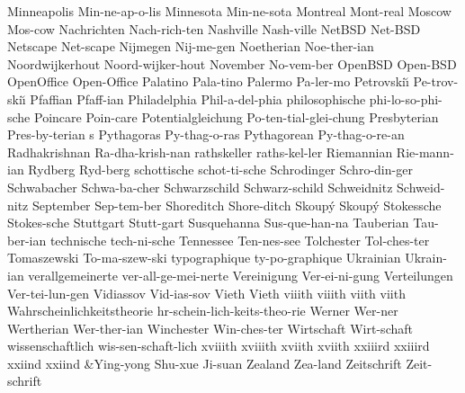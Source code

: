 \1 Minneapolis		Min-ne-ap-o-lis
\1 Minnesota		Min-ne-sota
\1 Montreal		Mont-real		%
\1 Moscow		Mos-cow
\1 Nachrichten          Nach-rich-ten
\1 Nashville		Nash-ville
\1 NetBSD		Net-BSD 		%
\1 Netscape		Net-scape		%
\1 Nijmegen		Nij-me-gen
\1 Noetherian		Noe-ther-ian
\1 Noordwijkerhout	Noord-wijker-hout
\1 November		No-vem-ber
\1 OpenBSD		Open-BSD		%
\1 OpenOffice		Open-Office		%
\1 Palatino		Pala-tino		%
\1 Palermo		Pa-ler-mo
\1 Petrovski\u\i{}	Pe-trov-ski\u\i{}	%
\1 Pfaffian		Pfaff-ian		%
\1 Philadelphia		Phil-a-del-phia
\1 philosophische       phi-lo-so-phi-sche	%
\1 Poincare		Poin-care
\1 Potentialgleichung	Po-ten-tial-glei-chung
\5 Presbyterian		Pres-by-terian s	%
\NewWordtrue
\1 Pythagoras		Py-thag-o-ras		%
\NewWordtrue
\1 Pythagorean		Py-thag-o-re-an		%
\1 Radhakrishnan	Ra-dha-krish-nan   %
\1 rathskeller		raths-kel-ler
\1 Riemannian		Rie-mann-ian
\1 Rydberg		Ryd-berg
\1 schottische		schot-ti-sche
\1 Schrodinger		Schro-din-ger
\1 Schwabacher		Schwa-ba-cher
\1 Schwarzschild	Schwarz-schild
\NewWordtrue
\1 Schweidnitz		Schweid-nitz		%
\1 September		Sep-tem-ber
\1 Shoreditch		Shore-ditch		%
\NewWordtrue
\1 Skoup\'y		Skoup\'y		%
\1 Stokessche		Stokes-sche
\1 Stuttgart		Stutt-gart
\1 Susquehanna		Sus-que-han-na
\1 Tauberian		Tau-ber-ian          %
\1 technische		tech-ni-sche
\1 Tennessee		Ten-nes-see
\NewWordtrue
\1 Tolchester		Tol-ches-ter		%
\1 Tomaszewski		To-ma-szew-ski		%
\1 typographique	ty-po-graphique      %
\1 Ukrainian		Ukrain-ian
\1 verallgemeinerte	ver-all-ge-mei-nerte
\1 Vereinigung		Ver-ei-ni-gung
\1 Verteilungen 	Ver-tei-lun-gen
\NewWordtrue
\1 Vidiassov		Vid-ias-sov		%
\1 Vieth		Vieth			%
\1 viiith		viiith			%
\1 viith		viith			%
\1 Wahrscheinlichkeitstheorie  hr-schein-lich-keits-theo-rie
\1 Werner		Wer-ner		%
\1 Wertherian		Wer-ther-ian
\1 Winchester		Win-ches-ter
\1 Wirtschaft		Wirt-schaft		%
\1 wissenschaftlich	wis-sen-schaft-lich
\1 xviiith		xviiith			%
\1 xviith		xviith			%
\1 xxiiird		xxiiird			%
\1 xxiind		xxiind			%
\tabalign {}&Ying-yong Shu-xue Ji-suan\cr
\1 Zealand		Zea-land
\1 Zeitschrift		Zeit-schrift
\endgraf
\endgroup

\makesignature
\endarticle

